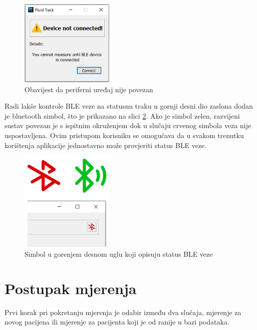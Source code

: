 \documentclass[../diplomski_rad.tex]{subfiles}
\begin{document}
\begin{figure}[htb]
    \centering
    \includegraphics[width=0.4\textwidth]{Figures/ble_not_connected.png} 
    \caption{Obavijest da periferni uređaj nije povezan}
    \label{slk:ble_not_connected}
\end{figure}

Radi lakše kontrole BLE veze na statusnu traku u gornji desni dio zaslona dodan je bluetooth simbol, 
što je prikazano na slici \ref{slk:ble_status}. 
Ako je simbol zelen, razvijeni sustav povezan je s ispitnim okruženjem dok u slučaju crvenog simbola veza nije uspostavljena. 
Ovim pristupom korisniku se omogućava da u svakom trenutku korištenja aplikacije jednostavno može provjeriti status BLE veze. 

\begin{figure}[htb]
    \centering
    \includegraphics[width=0.4\textwidth]{Figures/ble_status.png} 
    \caption{Simbol u gorenjem desnom uglu koji opisuju status BLE veze \cite{ikone}}
    \label{slk:ble_status}
\end{figure}

\section{Postupak mjerenja}

Prvi korak pri pokretanju mjerenja je odabir između dva slučaja, mjerenje za novog pacijena ili 
mjerenje za pacijenta koji je od ranije u bazi podataka.
\end{document}
